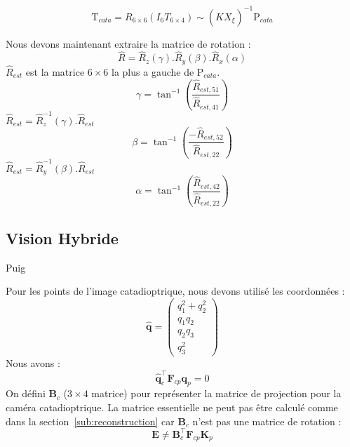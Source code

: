 \begin{equation}
\text{T}_{cata} = R_{6\times6} \left(I_6 T_{6\times4} \right) \sim (\hat{K}X_\xi )^{-1} \text{P}_{cata}
\end{equation}

Nous devons maintenant extraire la matrice de rotation :
\begin{equation}
\hat{R} = \hat{R}_z(\gamma).\hat{R}_y(\beta).\hat{R}_x(\alpha)
\end{equation}
$\hat{R}_{est}$ est la matrice $6\times6$ la plus a gauche de $\text{P}_{cata}$.
\begin{equation}
\gamma = \tan^{-1}\left(\frac{\hat{R}_{est,51}}{\hat{R}_{est,41}}\right)
\end{equation}
$\hat{R}_{est} = \hat{R}_z^{-1}(\gamma).\hat{R}_{est}$
\begin{equation}
\beta = \tan^{-1}\left(\frac{-\hat{R}_{est,52}}{\hat{R}_{est,22}}\right)
\end{equation}
$\hat{R}_{est} = \hat{R}_y^{-1}(\beta).\hat{R}_{est}$
\begin{equation}
\alpha = \tan^{-1}\left(\frac{\hat{R}_{est,42}}{\hat{R}_{est,22}}\right)
\end{equation}

\subsection{Vision Hybride}
Puig \cite{Puig08}

Pour les points de l'image catadioptrique, nous devons utilisé les coordonnées \cite{lifted}:
$$\hat{\mathbf{q}}=\begin{pmatrix}q_1^2+q_2^2\\q_1q_2\\q_2q_3\\q_3^2\end{pmatrix}$$
Nous avons :
\begin{equation}
\hat{\mathbf{q}}_c^{\top}\mathbf{F}_{cp}\mathbf{q}_p=0
\end{equation}
On défini $\mathbf{B}_c$ ($3\times4$ matrice) pour représenter la matrice de projection pour la caméra catadioptrique.
La matrice essentielle ne peut pas \^etre calculé comme dans la section~\ref{sub:reconstruction} car $\mathbf{B}_c$ n'est pas une matrice de rotation :
\begin{equation}
\mathbf{E} \neq \mathbf{B}_c^{\top} \mathbf{F}_{cp} \mathbf{K}_p
\end{equation}
